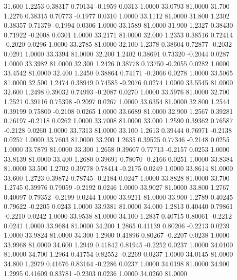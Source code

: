  31.600   1.2253   0.38317   0.70134  -0.1959   0.0313   1.0000  33.0793  81.0000
  31.700   1.2276   0.38315   0.70773  -0.1977   0.0310   1.0000  33.1112  81.0000
  31.800   1.2302   0.38357   0.71379  -0.1994   0.0306   1.0000  33.1589  81.0000
  31.900   1.2327   0.38430   0.71922  -0.2008   0.0301   1.0000  33.2171  81.0000
  32.000   1.2353   0.38516   0.72414  -0.2020   0.0296   1.0000  33.2785  81.0000
  32.100   1.2378   0.38604   0.72877  -0.2032   0.0291   1.0000  33.3394  81.0000
  32.200   1.2402   0.38691   0.73320  -0.2044   0.0287   1.0000  33.3982  81.0000
  32.300   1.2426   0.38778   0.73750  -0.2055   0.0282   1.0000  33.4542  81.0000
  32.400   1.2450   0.38864   0.74171  -0.2066   0.0278   1.0000  33.5065  81.0000
  32.500   1.2474   0.38949   0.74585  -0.2076   0.0274   1.0000  33.5545  81.0000
  32.600   1.2498   0.39032   0.74993  -0.2087   0.0270   1.0000  33.5976  81.0000
  32.700   1.2521   0.39116   0.75398  -0.2097   0.0267   1.0000  33.6354  81.0000
  32.800   1.2544   0.39199   0.75800  -0.2108   0.0265   1.0000  33.6689  81.0000
  32.900   1.2567   0.39281   0.76197  -0.2118   0.0262   1.0000  33.7008  81.0000
  33.000   1.2590   0.39362   0.76587  -0.2128   0.0260   1.0000  33.7313  81.0000
  33.100   1.2613   0.39444   0.76971  -0.2138   0.0257   1.0000  33.7603  81.0000
  33.200   1.2635   0.39525   0.77346  -0.2148   0.0255   1.0000  33.7879  81.0000
  33.300   1.2658   0.39607   0.77713  -0.2157   0.0253   1.0000  33.8139  81.0000
  33.400   1.2680   0.39691   0.78070  -0.2166   0.0251   1.0000  33.8384  81.0000
  33.500   1.2702   0.39778   0.78414  -0.2175   0.0249   1.0000  33.8614  81.0000
  33.600   1.2723   0.39872   0.78745  -0.2184   0.0247   1.0000  33.8828  81.0000
  33.700   1.2745   0.39976   0.79059  -0.2192   0.0246   1.0000  33.9027  81.0000
  33.800   1.2767   0.40097   0.79352  -0.2199   0.0244   1.0000  33.9211  81.0000
  33.900   1.2789   0.40245   0.79622  -0.2205   0.0243   1.0000  33.9381  81.0000
  34.000   1.2813   0.40440   0.79861  -0.2210   0.0242   1.0000  33.9538  81.0000
  34.100   1.2837   0.40715   0.80061  -0.2212   0.0241   1.0000  33.9684  81.0000
  34.200   1.2865   0.41139   0.80206  -0.2213   0.0239   1.0000  33.9824  81.0000
  34.300   1.2900   0.41896   0.80267  -0.2207   0.0238   1.0000  33.9968  81.0000
  34.600   1.2949   0.41842   0.81945  -0.2252   0.0237   1.0000  34.0100  81.0000
  34.700   1.2964   0.41754   0.82552  -0.2269   0.0237   1.0000  34.0145  81.0000
  34.800   1.2979   0.41676   0.83164  -0.2286   0.0237   1.0000  34.0198  81.0000
  34.900   1.2995   0.41609   0.83781  -0.2303   0.0236   1.0000  34.0260  81.0000
